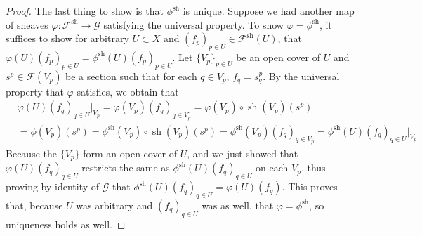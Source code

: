 \documentclass{article}
\newcommand{\fF}{\mathscr{F}}
\newcommand{\fG}{\mathscr{G}}
\DeclareMathOperator{\sh}{sh}
\begin{document}
\begin{proof}
        The last thing to show is that $\phi^{\sh}$ is unique. Suppose we had another map of sheaves $\varphi:\fF^{\sh}\to \fG$ satisfying the universal property. To show $\varphi=\phi^{\sh}$, it suffices to show for arbitrary $U\subset X$ and $(f_p)_{p\in U}\in \fF^{\sh}(U)$, that $\varphi(U)(f_p)_{p\in U}=\phi^{\sh}(U)(f_p)_{p\in U}$. Let $\{V_p\}_{p\in U}$ be an open cover of $U$ and $s^p\in \fF(V_p)$ be a section such that for each $q\in V_p$, $f_q=s^p_q$. By the universal property that $\varphi$ satisfies, we obtain that
        \begin{align*}
            &\varphi(U)(f_q)_{q\in U}\vert_{V_p}=\varphi(V_p)(f_q)_{q\in V_p}=\varphi(V_p)\circ \sh(V_p)(s^p)\\
            &=\phi(V_p)(s^p)=\phi^{\sh}(V_p)\circ \sh(V_p)(s^p)=\phi^{\sh}(V_p)(f_q)_{q\in V_p}=\phi^{\sh}(U)(f_q)_{q\in U} \vert_{V_p}
        \end{align*}
        Because the $\{V_p\}$ form an open cover of $U$, and we just showed that $\varphi(U)(f_q)_{q\in U}$ restricts the same as $\phi^{\sh}(U)(f_q)_{q\in U}$ on each $V_p$, thus proving by identity of $\fG$ that $\phi^{\sh}(U)(f_q)_{q\in U}=\varphi(U)(f_q)$. This proves that, because $U$ was arbitrary and $(f_q)_{q\in U}$ was as well, that $\varphi=\phi^{\sh}$, so uniqueness holds as well.
\end{proof}
\end{document}
